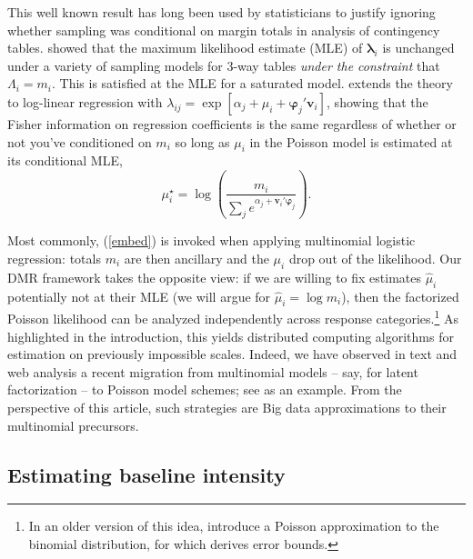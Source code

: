 \documentclass[12pt]{article}
\newcommand{\bs}[1]{\boldsymbol{#1}}
\newcommand{\bm}[1]{\mathbf{#1}}
\begin{document}
This well known result has long been used by statisticians to justify ignoring
whether sampling was conditional on margin totals in analysis of contingency
tables. \cite{birch_maximum_1963} showed that the maximum likelihood estimate
(MLE) of $\bs{\lambda}_i$ is unchanged under a variety of sampling models for
3-way tables {\it under the constraint} that $\Lambda_{i} = m_i$. This is
satisfied at the MLE for a saturated model. \cite{palmgren_fisher_1981}
extends the theory to log-linear regression with $\lambda_{ij} = \exp[\alpha_j
+ \mu_i + \bs{\varphi}_j'\bm{v}_i]$, showing that the Fisher information on
  regression coefficients is the same regardless of whether or not you've
  conditioned on $m_i$  so long as $\mu_i$ in the Poisson model is estimated
  at its conditional MLE, 
 \begin{equation} \label{mlemu}
  \mu_i^\star =
\log\left(\frac{m_i}{\sum_j e^{\alpha_j + \bm{v}_i'\bs{\varphi}_j}}\right).  
\end{equation}

Most commonly, (\ref{embed}) is invoked when applying multinomial logistic
regression: totals $m_i$ are then ancillary and the $\mu_i$ drop out of the
likelihood.  Our DMR framework takes the opposite view: if we are willing to
fix estimates $\hat\mu_i$ potentially not at their MLE (we will argue for
$\hat\mu_i = \log m_i$), then the factorized Poisson likelihood can be
analyzed independently across response categories.\footnote{In an older version
of this idea, \cite{hodges_poisson_1960} introduce a Poisson approximation
to the binomial distribution, for which
\cite{mcdonald_poisson_1980} derives error bounds.} As
highlighted in the introduction, this yields distributed computing algorithms
for estimation on previously impossible scales.  Indeed, we have observed in
text and web analysis a recent migration from multinomial models -- say, for
latent factorization -- to Poisson model schemes; see
\citet{gopalan_scalable_2013} as an example.  From the perspective of this
article, such strategies are Big data approximations to their
multinomial precursors.


\subsection{Estimating baseline intensity}
\label{MU}
\end{document}

